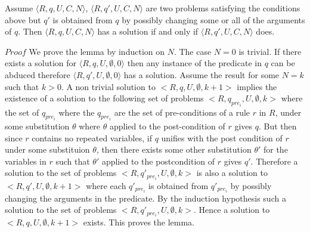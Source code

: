 \documentclass[sigconf]{acmart}
\begin{document}
\begin{lemma}
Assume $\langle R,q,U,C,N\rangle$, $\langle R,q',U,C,N\rangle$ are two problems satisfying the conditions above but $q'$ is obtained from $q$ by possibly changing some or all of the arguments of $q$. Then $\langle R,q,U,C,N\rangle$ has a solution if and only if $\langle R,q',U,C,N\rangle$ does.\\
\end{lemma}
$Proof$ We prove the lemma by induction on $N$.
The case $N = 0$ is trivial. If there exists a solution for $\langle R,q,U,\emptyset,0\rangle$ then any instance of the predicate in $q$ can be abduced therefore $\langle R,q',U,\emptyset,0\rangle$ has a solution. Assume the result for some $N = k$ such that $k>0$. A non trivial solution to $<R,q,U,\emptyset,k+1>$ implies the existence of a solution to the following set of problems $<R,q_{pre_{i}},U,\emptyset,k>$ where the set of $q_{pre_{i}}$ where the $q_{pre_{i}}$ are the set of pre-conditions of a rule $r$ in $R$, under some substitution $\theta$ where $\theta$ applied to the post-condition of $r$ gives $q$. But then since $r$ contains no repeated variables, if $q$ unifies with the post condition of $r$ under some substituion $\theta$, then there exists some other substitution $\theta'$ for the variables in $r$ such that $\theta'$ applied to the postcondition of $r$ gives $q'$. Therefore a solution to the set of problems $<R,q'_{pre_{i}},U,\emptyset,k>$ is also a solution to $<R,q',U,\emptyset,k+1>$ where each $q'_{pre_{i}}$ is obtained from $q'_{pre_{i}}$ by possibly changing the arguments in the predicate. By the induction hypothesis such a solution to the set of problems $<R,q'_{pre_{i}},U,\emptyset,k>$. Hence a solution to  $<R,q,U,\emptyset,k+1>$ exists. This proves the lemma.\\
\end{document}
